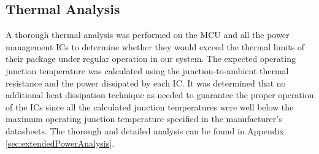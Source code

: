 \subsection{Thermal Analysis}
A thorough thermal analysis was performed on the MCU and all the power management ICs to determine whether they would exceed the thermal limits of their package under regular operation in our system.  The expected operating junction temperature was calculated using the junction-to-ambient thermal resistance and the power dissipated by each IC.  It was determined that no additional heat dissipation technique as needed to guarantee the proper operation of the ICs since all the calculated junction temperatures were well below the maximum operating junction temperature specified in the manufacturer's datasheets.  The thorough and detailed analysis can be found in Appendix \ref{sec:extendedPowerAnalysis}.


